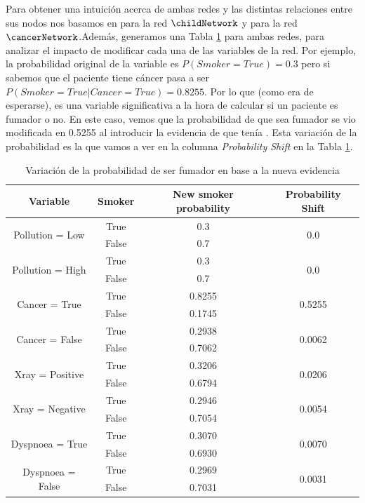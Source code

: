 Para obtener una intuición acerca de ambas redes y las distintas relaciones entre sus nodos nos basamos en \cite{childNetwork} para la red $\childNetwork$ y \cite{cancerNetwork} para la red $\cancerNetwork$.Además, generamos una Tabla \ref{tab:phi_smoker_with_shift} para ambas redes, para analizar el impacto de modificar cada una de las variables de la red. Por ejemplo, la probabilidad original de la variable  es $P(Smoker=True)=0.3$ pero si sabemos que el paciente tiene cáncer pasa a ser $P(Smoker=True|Cancer=True)=0.8255$. Por lo que (como era de esperarse),  es una variable significativa a la hora de calcular si un paciente es fumador o no. En este caso, vemos que la probabilidad de que sea fumador se vio modificada en 0.5255 al introducir la evidencia de que tenía . Esta variación de la probabilidad es la que vamos a ver en la columna \emph{Probability Shift} en la Tabla \ref{tab:phi_smoker_with_shift}.

\begin{table}[ht]
	\centering
	\begin{tabular}{|c|c|c|c|}
		\hline
		\textbf{Variable} & \textbf{Smoker} & \textbf{New smoker probability} & \textbf{Probability Shift} \\
		\hline
		\multirow{2}{*}{Pollution = Low} & True  & 0.3 & \multirow{2}{*}{0.0} \\
		& False & 0.7 & \\
		\hline
		\multirow{2}{*}{Pollution = High} & True  & 0.3 & \multirow{2}{*}{0.0} \\
		& False & 0.7 & \\
		\hline
		\multirow{2}{*}{Cancer = True} & True  & 0.8255 & \multirow{2}{*}{0.5255} \\
		& False & 0.1745 & \\
		\hline
		\multirow{2}{*}{Cancer = False} & True  & 0.2938 & \multirow{2}{*}{0.0062} \\
		& False & 0.7062 & \\
		\hline
		\multirow{2}{*}{Xray = Positive} & True  & 0.3206 & \multirow{2}{*}{0.0206} \\
		& False & 0.6794 & \\
		\hline
		\multirow{2}{*}{Xray = Negative} & True  & 0.2946 & \multirow{2}{*}{0.0054} \\
		& False & 0.7054 & \\
		\hline
		\multirow{2}{*}{Dyspnoea = True} & True  & 0.3070 & \multirow{2}{*}{0.0070} \\
		& False & 0.6930 & \\
		\hline
		\multirow{2}{*}{Dyspnoea = False} & True  & 0.2969 & \multirow{2}{*}{0.0031} \\
		& False & 0.7031 & \\
		\hline
	\end{tabular}
	\caption{Variación de la probabilidad de ser fumador en base a la nueva evidencia}
	\label{tab:phi_smoker_with_shift}
\end{table}

